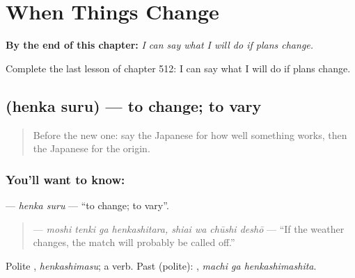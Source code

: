 
\chapter{When Things Change}
\label{ch:ja-when-things-change}

\begin{chapteropening}
\textbf{By the end of this chapter:} \emph{I can say what I will do if plans change.}

Complete the last lesson of chapter 512: I can say what I will do if plans change.
\end{chapteropening}

\section[\texorpdfstring{\ja{へんかする} (henka suru)}{へんかする (henka suru)}]{ (henka suru) — to change; to vary}

\label{lesson:JA-C512-henka-suru}



\begin{quote}
Before the new one: say the Japanese for how well something works, then the Japanese for the origin.
\end{quote}

\subsection*{You'll want to know: }
\textbf{} — \emph{henka suru} — \textquotedblleft{}to change; to vary\textquotedblright{}.

\begin{quote}
\textbf{   } — \emph{moshi tenki ga henkashitara, shiai wa chūshi deshō} — \textquotedblleft{}If the weather changes, the match will probably be called off.\textquotedblright{}
\end{quote}

Polite \textbf{}, \emph{henkashimasu}; a  verb. Past (polite): \textbf{ }, \emph{machi ga henkashimashita}.

